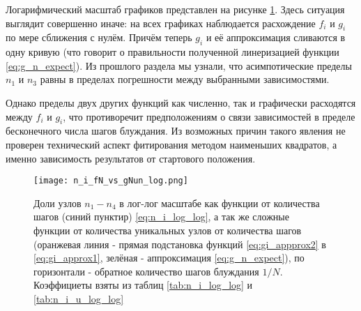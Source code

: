 Логарифмический масштаб графиков представлен на рисунке \ref{fig:ni_fn_vs_gNun_log}. 
Здесь ситуация выглядит совершенно иначе: на всех графиках наблюдается расхождение $f_i$ и $g_i$ по мере сближения с нулём.
Причём теперь $g_i$ и её аппроксимация сливаются в одну кривую (что говорит о правильности полученной линеризацией функции \eqref{eq:g_n_expect}). 
Из прошлого раздела мы узнали, что асимпотические пределы $n_1$ и $n_3$ равны в пределах погрешности между выбранными зависимостями.

Однако пределы двух других функций как численно, так и графически расходятся между $f_i$ и $g_i$, что противоречит предположениям о связи зависимостей в пределе бесконечного числа шагов блуждания.
Из возможных причин такого явления не проверен технический аспект фитирования методом наименьших квадратов, а именно зависимость результатов от стартового положения.


\begin{figure}
\centering
\texttt{[image: n\_i\_fN\_vs\_gNun\_log.png]}
\label{fig:ni_fn_vs_gNun_log}
\caption{Доли узлов $n_1-n_4$ в лог-лог масштабе как функции от количества шагов (синий пунктир) \eqref{eq:n_i_log_log}, а так же сложные функции от количества уникальных узлов от количества шагов (оранжевая линия - прямая подстановка функций  \eqref{eq:gi_appprox2} в \eqref{eq:gi_approx1}, зелёная - аппроксимация \eqref{eq:g_n_expect}), по горизонтали - обратное количество шагов блуждания $1/N$. Коэффициеты взяты из таблиц \ref{tab:n_i_log_log} и \ref{tab:n_i_u_log_log}}
\end{figure}